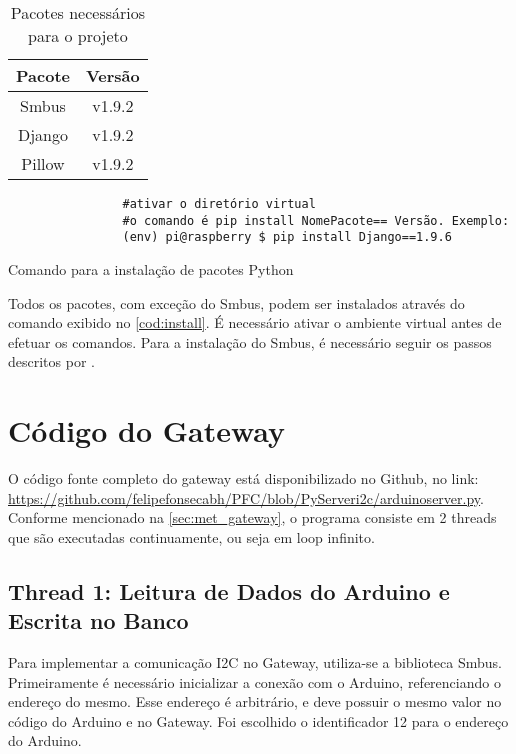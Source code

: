 			
			\begin{table}[!htb]
				\centering
				\caption{Pacotes necessários para o projeto}
				\label{tbl6}
				\def\arraystretch{1.3}
				\begin{tabular}{c c}
					\hline
					\multicolumn{1}{c}{\textbf{Pacote}} & \multicolumn{1}{c}{\textbf{Versão}} \\ \hline
					
					Smbus & v1.9.2 \\
					Django & v1.9.2 \\ %
					Pillow & v1.9.2 \\ %
					\hline
				\end{tabular}
			\end{table}
		
			\begin{listing}[!htb]
				\begin{verbatim}
				#ativar o diretório virtual
				#o comando é pip install NomePacote== Versão. Exemplo:
				(env) pi@raspberry $ pip install Django==1.9.6					
				\end{verbatim}
				\caption{Comando para a instalação de pacotes Python}
				\label{cod:install}
			\end{listing}
		
			Todos os pacotes, com exceção do Smbus, podem ser instalados através do comando exibido no \autoref{cod:install}. É necessário ativar o ambiente virtual antes de efetuar os comandos. Para a instalação do Smbus, é necessário seguir os passos descritos por \textcite{dipto2015}. 
			
		
		
		\section{Código do Gateway}
			O código fonte completo do gateway está disponibilizado no Github, no link: \url{https://github.com/felipefonsecabh/PFC/blob/PyServeri2c/arduinoserver.py}. Conforme mencionado na \autoref{sec:met_gateway}, o programa consiste em 2 threads que são executadas continuamente, ou seja em loop infinito.
			
			\subsection{Thread 1: Leitura de Dados do Arduino e Escrita no Banco}
				Para implementar a comunicação I2C no Gateway, utiliza-se a biblioteca Smbus. Primeiramente é necessário inicializar a conexão com o Arduino, referenciando o endereço do mesmo. Esse endereço é arbitrário, e deve possuir o mesmo valor no código do Arduino e no Gateway. Foi escolhido o identificador 12 para o endereço do Arduino.
				
